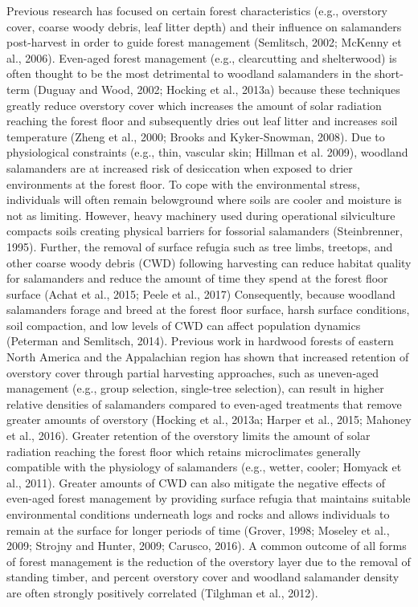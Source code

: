 Previous research has focused on certain forest characteristics (e.g., overstory cover, coarse woody debris, leaf litter depth) and their influence on salamanders post-harvest in order to guide forest management (Semlitsch, 2002; McKenny et al., 2006).
Even-aged forest management (e.g., clearcutting and shelterwood) is often thought to be the most detrimental to woodland salamanders in the short-term (Duguay and Wood, 2002; Hocking et al., 2013a) 
because these techniques greatly reduce overstory cover which increases the amount of solar radiation reaching the forest floor and subsequently dries out leaf litter and increases soil temperature (Zheng et al., 2000; Brooks and Kyker-Snowman, 2008).
Due to physiological constraints (e.g., thin, vascular skin; Hillman et al. 2009), woodland salamanders are at increased risk of desiccation when exposed to drier environments at the forest floor.
To cope with the environmental stress, individuals will often remain belowground where soils are cooler and moisture is not as limiting. 
However, heavy machinery used during operational silviculture compacts soils creating physical barriers for fossorial salamanders (Steinbrenner, 1995).
Further, the removal of surface refugia such as tree limbs, treetops, and other coarse woody debris (CWD) following harvesting can reduce habitat quality for salamanders and reduce the amount of time they spend at the forest floor surface (Achat et al., 2015; Peele et al., 2017)
Consequently, because woodland salamanders forage and breed at the forest floor surface, harsh surface conditions, soil compaction, and low levels of CWD can affect population dynamics (Peterman and Semlitsch, 2014).
Previous work in hardwood forests of eastern North America and the Appalachian region has shown that increased retention of overstory cover through partial harvesting approaches, such as uneven-aged management (e.g., group selection, single-tree selection), 
can result in higher relative densities of salamanders compared to even-aged treatments that remove greater amounts of overstory (Hocking et al., 2013a; Harper et al., 2015; Mahoney et al., 2016).
Greater retention of the overstory limits the amount of solar radiation reaching the forest floor which retains microclimates generally compatible with the physiology of salamanders (e.g., wetter, cooler; Homyack et al., 2011).
Greater amounts of CWD can also mitigate the negative effects of even-aged forest management by providing surface refugia that maintains suitable environmental conditions underneath logs and rocks and allows individuals to remain at the surface for longer periods of time (Grover, 1998; Moseley et al., 2009; Strojny and Hunter, 2009; Carusco, 2016).
A common outcome of all forms of forest management is the reduction of the overstory layer due to the removal of standing timber, and percent overstory cover and woodland salamander density are often strongly positively correlated (Tilghman et al., 2012).

